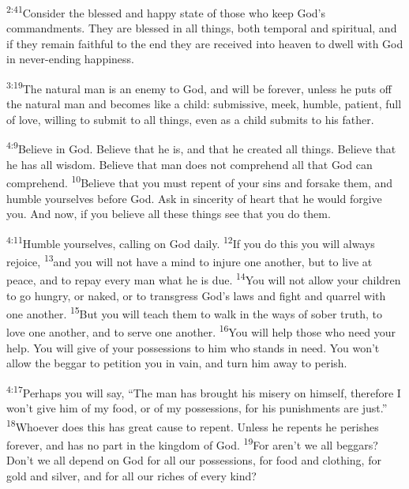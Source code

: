 \documentclass[openany,12pt,english]{book}
\newenvironment{para}{\par\pretolerance=100\tolerance=200\setlength{\emergencystretch}{0.6em}\relax}{\par}
\begin{document}
\begin{para}
    \textsuperscript{2:41}\thinspace{}Con\-sid\-er the bless\-ed and hap\-py state of those who keep God's commandments. They are bless\-ed in all things, both tem\-po\-ral and spir\-it\-u\-al, and if they re\-main faith\-ful to the end they are re\-ceived in\-to heav\-en to dwell with God in never-ending hap\-pi\-ness.
\end{para}

\begin{para}
    \textsuperscript{3:19}\thinspace{}The nat\-u\-ral man is an en\-e\-my to God, and will be for\-ev\-er, un\-less he puts off the nat\-u\-ral man and becomes like a child: sub\-mis\-sive, meek, hum\-ble, pa\-tient, full of love, will\-ing to sub\-mit to all things, e\-ven as a child submits to his fa\-ther.
\end{para}

\begin{para}
    \textsuperscript{4:9}\thinspace{}Be\-lieve in God. Be\-lieve that he is, and that he cre\-at\-ed all things. Be\-lieve that he has all wis\-dom. Be\-lieve that man does not com\-pre\-hend all that God can com\-pre\-hend.
    \textsuperscript{10}\thinspace{}Be\-lieve that you must re\-pent of your sins and for\-sake them, and hum\-ble your\-selves be\-fore God. Ask in sin\-cer\-i\-ty of heart that he would for\-give you. And now, if you be\-lieve all these things see that you do them.
\end{para}

\begin{para}
    \textsuperscript{4:11}\thinspace{}Hum\-ble your\-selves, call\-ing on God dai\-ly.
    \textsuperscript{12}\thinspace{}If you do this you will al\-ways re\-joice,
    \textsuperscript{13}\thinspace{}and you will not have a mind to in\-jure one an\-oth\-er, but to live at peace, and to re\-pay eve\-ry man what he is due.
    \textsuperscript{14}\thinspace{}You will not al\-low your chil\-dren to go hun\-gry, or na\-ked, or to trans\-gress God's laws and fight and quar\-rel with one an\-oth\-er.
    \textsuperscript{15}\thinspace{}But you will teach them to walk in the ways of so\-ber truth, to love one an\-oth\-er, and to serve one an\-oth\-er.
    \textsuperscript{16}\thinspace{}You will help those who need your help. You will give of your possessions to him who stands in need. You won't al\-low the beg\-gar to pe\-ti\-tion you in vain, and turn him a\-way to per\-ish.
\end{para}

\begin{para}
    \textsuperscript{4:17}\thinspace{}Per\-haps you will say, “The man has brought his mis\-er\-y on him\-self, there\-fore I won't give him of my food, or of my possessions, for his punishments are just.”
    \textsuperscript{18}\thinspace{}Who\-ev\-er does this has great cause to re\-pent. Un\-less he repents he perishes for\-ev\-er, and has no part in the king\-dom of God.
    \textsuperscript{19}\thinspace{}For aren't we all beggars? Don't we all de\-pend on God for all our possessions, for food and cloth\-ing, for gold and sil\-ver, and for all our rich\-es of eve\-ry kind?
\end{para}
\end{document}
